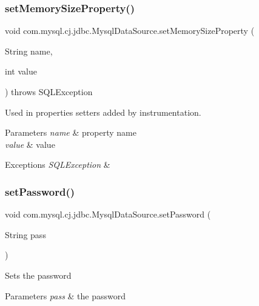 \subsubsection{\texorpdfstring{set\+Memory\+Size\+Property()}{setMemorySizeProperty()}}
{\footnotesize\ttfamily void com.\+mysql.\+cj.\+jdbc.\+Mysql\+Data\+Source.\+set\+Memory\+Size\+Property (\begin{DoxyParamCaption}\item[{String}]{name,  }\item[{int}]{value }\end{DoxyParamCaption}) throws S\+Q\+L\+Exception\hspace{0.3cm}{\ttfamily [protected]}}

Used in properties setters added by instrumentation.


\begin{DoxyParams}{Parameters}
{\em name} & property name \\
\hline
{\em value} & value \\
\hline
\end{DoxyParams}

\begin{DoxyExceptions}{Exceptions}
{\em S\+Q\+L\+Exception} & \\
\hline
\end{DoxyExceptions}
\mbox{\label{classcom_1_1mysql_1_1cj_1_1jdbc_1_1_mysql_data_source_aba660c9f74325976f0a4b217f833f163}} 
\subsubsection{\texorpdfstring{set\+Password()}{setPassword()}}
{\footnotesize\ttfamily void com.\+mysql.\+cj.\+jdbc.\+Mysql\+Data\+Source.\+set\+Password (\begin{DoxyParamCaption}\item[{String}]{pass }\end{DoxyParamCaption})}

Sets the password


\begin{DoxyParams}{Parameters}
{\em pass} & the password \\
\hline
\end{DoxyParams}
\mbox{\label{classcom_1_1mysql_1_1cj_1_1jdbc_1_1_mysql_data_source_a008a1d301424119b5820fa8e3acd1ce7}} 
